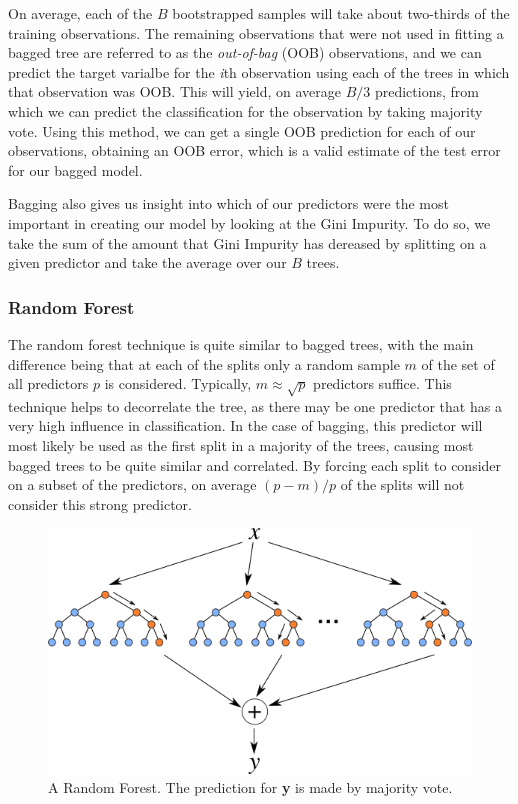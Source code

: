 \documentclass[preprint,12pt]{elsarticle}
\begin{document}
On average, each of the $B$ bootstrapped samples will take about two-thirds of the training observations.  The remaining observations that were not used in fitting a bagged tree are referred to as the \textit{out-of-bag} (OOB) observations, and we can predict the target varialbe for the \textit{i}th observation using each of the trees in which that observation was OOB. This will yield, on average $B/3$ predictions, from which we can predict the classification for the observation by taking majority vote. Using this method, we can get a single OOB prediction for each of our observations, obtaining an OOB error, which is a valid estimate of the test error for our bagged model.

Bagging also gives us insight into which of our predictors were the most important in creating our model by looking at the Gini Impurity. To do so, we take the sum of the amount that Gini Impurity has dereased by splitting on a given predictor and take the average over our $B$ trees.

\subsubsection{Random Forest}
The random forest technique is quite similar to bagged trees, with the main difference being that at each of the splits only a random sample $m$ of the set of all predictors $p$ is considered. Typically, $m \approx \sqrt{p}$ predictors suffice. This technique helps to decorrelate the tree, as there may be one predictor that has a very high influence in classification. In the case of bagging, this predictor will most likely be used as the first split in a majority of the trees, causing most bagged trees to be quite similar and correlated. By forcing each split to consider on a subset of the predictors, on average $(p-m)/p$ of the splits will not consider this strong predictor.

\begin{figure}[h]
	\centering
	\includegraphics[width=1\textwidth]{RF}
	\caption{A Random Forest\cite{Smith:2013jd}. The prediction for \textbf{y} is made by majority vote.}
\end{figure}
\end{document}
